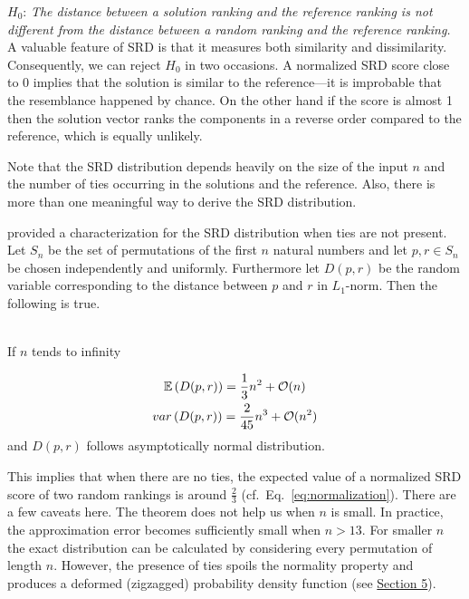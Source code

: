 $H_0$: \emph{The distance between a solution ranking and the reference ranking is not different from the distance between a random ranking and the reference ranking.}\\

A valuable feature of SRD is that it measures both similarity and dissimilarity. Consequently, we can reject $H_0$ in two occasions. A normalized SRD score close to 0 implies that the solution is similar to the reference---it is improbable that the resemblance happened by chance. On the other hand if the score is almost 1 then the solution vector ranks the components in a reverse order compared to the reference, which is equally unlikely.

Note that the SRD distribution depends heavily on the size of the input $n$ and the number of ties occurring in the solutions and the reference. Also, there is more than one meaningful way to derive the SRD distribution.

\cite{Diaconis_Graham_1977} provided a characterization for the SRD distribution when ties are not present. Let $S_n$ be the set of permutations of the first $n$ natural numbers and let $p, r \in S_n$ be chosen independently and uniformly. Furthermore let $D(p,r)$ be the random variable corresponding to the distance between $p$ and $r$ in $L_1$-norm. Then the following is true.

\begin{theorem}{\citep{Diaconis_Graham_1977}\\}
If $n$ tends to infinity

\begin{gather}
    \mathbb{E}\left(D(p,r)\right)=\frac{1}{3}n^2+\mathcal{O}(n) \notag\\
    var\left(D(p,r)\right)=\frac{2}{45}n^3+\mathcal{O}(n^2) \notag
\end{gather}
\noindent and $D(p,r)$ follows asymptotically normal distribution.
\end{theorem}

This implies that when there are no ties, the expected value of a normalized SRD score of two random rankings is around $\frac{2}{3}$ (cf.\  Eq.~\ref{eq:normalization}).
There are a few caveats here. The theorem does not help us when $n$ is small. In practice, the approximation error becomes sufficiently small when $n>13$. For smaller $n$ the exact distribution can be calculated by considering every permutation of length $n$. However, the presence of ties spoils the normality property and produces a deformed (zigzagged) probability density function (see \hyperref[sec:small_data]{Section 5}).%


